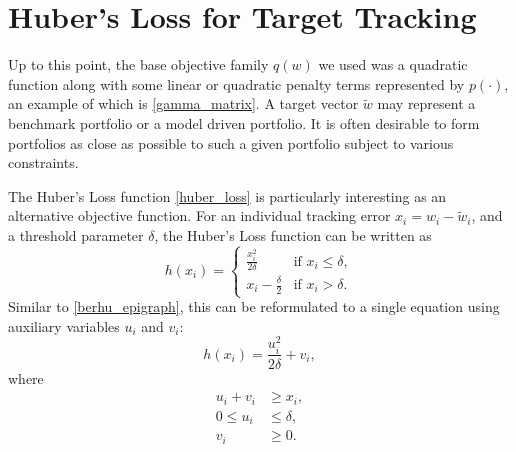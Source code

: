 \documentclass[11pt, letterpaper]{article}
\begin{document}

\section{Huber's Loss for Target Tracking}
Up to this point, the base objective family $q(w)$ we used was a quadratic function along with some linear or quadratic penalty
terms represented by $p(\cdot)$, an example of which is \eqref{gamma_matrix}. A target vector $\tilde{w}$ may represent a benchmark
portfolio or a model driven portfolio. It is often desirable to form portfolios as close as possible to such a given portfolio
subject to various constraints.

The Huber's Loss function \eqref{huber_loss} is particularly interesting as an alternative objective function. For an individual tracking error $x_i = w_i - \tilde{w}_i$, and a threshold parameter $\delta$, the
Huber's Loss function can be written as
\begin{equation*}
    h(x_i) = \begin{cases}
        \frac{x_i^2}{2\delta} & \text{if } x_i \leq \delta, \\
        x_i - \frac{\delta}{2} & \text{if } x_i > \delta.
    \end{cases}
\end{equation*}
Similar to \eqref{berhu_epigraph}, this can be reformulated to a single equation using auxiliary
variables $u_i$ and $v_i$:
\begin{equation}
	\label{huber_loss_deviation_epigraph}
	h(x_i) = \frac{u_i^2}{2\delta} + v_i,
\end{equation}
where
\begin{align*}
	u_i + v_i &\geq x_i,\\
	0 \leq u_i &\leq \delta, \\
	v_i &\geq 0.
\end{align*}

\end{document}
